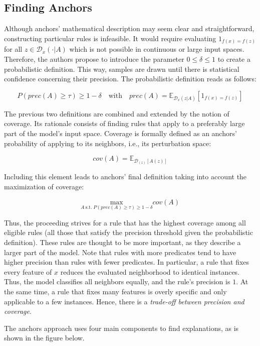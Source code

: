 \documentclass[
  12pt,
]{krantz}
\begin{document}
\hypertarget{finding-anchors}{%
\subsection{Finding Anchors}\label{finding-anchors}}

Although anchors' mathematical description may seem clear and straightforward, constructing particular rules is infeasible. It would require evaluating \(1_{f(x) = f(z)}\) for all \(z \in \mathcal{D}_x(\cdot|A)\) which is not possible in continuous or large input spaces. Therefore, the authors propose to introduce the parameter \(0 \leq \delta \leq 1\) to create a probabilistic definition. This way, samples are drawn until there is statistical confidence concerning their precision. The probabilistic definition reads as follows:

\[P(prec(A)\geq\tau)\geq{}1-\delta\quad\textrm{with}\quad{}prec(A)=\mathbb{E}_{\mathcal{D}_x(z|A)}[1_{f(x)=f(z)}]\]

The previous two definitions are combined and extended by the notion of coverage. Its rationale consists of finding rules that apply to a preferably large part of the model's input space. Coverage is formally defined as an anchors' probability of applying to its neighbors, i.e., its perturbation space:

\[cov(A)=\mathbb{E}_{\mathcal{D}_{(z)}[A(z)]}\]

Including this element leads to anchors' final definition taking into account the maximization of coverage:

\[\underset{A\:\textrm{s.t.}\;P(prec(A)\geq\tau)\geq{}1-\delta}{\textrm{max}}cov(A)\]

Thus, the proceeding strives for a rule that has the highest coverage among all eligible rules (all those that satisfy the precision threshold given the probabilistic definition). These rules are thought to be more important, as they describe a larger part of the model.
Note that rules with more predicates tend to have higher precision than rules with fewer predicates. In particular, a rule that fixes every feature of \(x\) reduces the evaluated neighborhood to identical instances. Thus, the model classifies all neighbors equally, and the rule's precision is \(1\). At the same time, a rule that fixes many features is overly specific and only applicable to a few instances. Hence, there is a \emph{trade-off between precision and coverage}.

The anchors approach uses four main components to find explanations, as is shown in the figure below.
\end{document}
